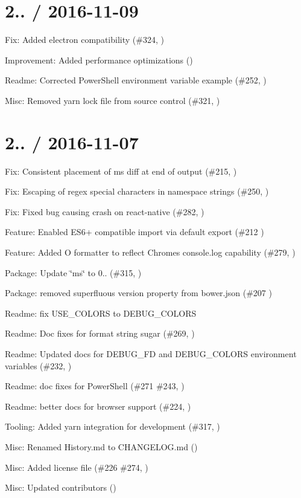 \section*{2.. / 2016-\/11-\/09 }


\begin{DoxyItemize}
\item Fix\+: Added electron compatibility (\#324, )
\item Improvement\+: Added performance optimizations ()
\item Readme\+: Corrected Power\+Shell environment variable example (\#252, )
\item Misc\+: Removed yarn lock file from source control (\#321, )
\end{DoxyItemize}

\section*{2.. / 2016-\/11-\/07 }


\begin{DoxyItemize}
\item Fix\+: Consistent placement of ms diff at end of output (\#215, )
\item Fix\+: Escaping of regex special characters in namespace strings (\#250, )
\item Fix\+: Fixed bug causing crash on react-\/native (\#282, )
\item Feature\+: Enabled E\+S6+ compatible import via default export (\#212 )
\item Feature\+: Added O formatter to reflect Chrome\textquotesingle{}s console.\+log capability (\#279, )
\item Package\+: Update \char`\"{}ms\char`\"{} to 0.. (\#315, )
\item Package\+: removed superfluous version property from bower.\+json (\#207 )
\item Readme\+: fix U\+S\+E\+\_\+\+C\+O\+L\+O\+RS to D\+E\+B\+U\+G\+\_\+\+C\+O\+L\+O\+RS
\item Readme\+: Doc fixes for format string sugar (\#269, )
\item Readme\+: Updated docs for D\+E\+B\+U\+G\+\_\+\+FD and D\+E\+B\+U\+G\+\_\+\+C\+O\+L\+O\+RS environment variables (\#232, )
\item Readme\+: doc fixes for Power\+Shell (\#271 \#243,  )
\item Readme\+: better docs for browser support (\#224, )
\item Tooling\+: Added yarn integration for development (\#317, )
\item Misc\+: Renamed History.\+md to C\+H\+A\+N\+G\+E\+L\+O\+G.\+md ()
\item Misc\+: Added license file (\#226 \#274,  )
\item Misc\+: Updated contributors ()
\end{DoxyItemize}

